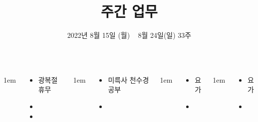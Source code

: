 \documentclass[	20pt, 
							a1paper, 
							portrait, %
							margin=0mm, %
							innermargin=10mm,  		%
							colspace=5mm, 
							subcolspace=0mm
							]{tikzposter}
\title{주간 업무}
\author{ 2022년 8월 15일 (월) ~ 8월 24일(일) 33주 }
\begin{document}
	\maketitle

	\begin{columns}


			{
					\setlength{\leftmargini}{7em}
					\setlength{\labelsep} {1em}
				\begin{LARGE}
					\begin{itemize}
					\item 광복절 휴무
					\item 
					\item 
					\end{itemize}
				\end{LARGE}
			}

			{
					\setlength{\leftmargini}{7em}
					\setlength{\labelsep} {1em}
				\begin{LARGE}
					\begin{itemize}
					\item 미륵사 천수경 공부
					\item 

					\end{itemize}
				\end{LARGE}
			}


			{
					\setlength{\leftmargini}{4em}
					\setlength{\labelsep} {1em}
				\begin{LARGE}
					\begin{itemize}
					\item 요가
					\item 
					\end{itemize}
				\end{LARGE}
			}



			{
					\setlength{\leftmargini}{4em}
					\setlength{\labelsep} {1em}
				\begin{LARGE}
					\begin{itemize}
					\item 요가
					\item 
					\end{itemize}
				\end{LARGE}
			}


\end{columns}
\end{document}
